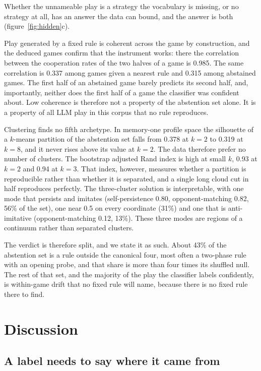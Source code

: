 \documentclass[11pt,a4paper]{article}
\begin{document}
Whether the unnameable play is a strategy the vocabulary is missing, or no
strategy at all, has an answer the data can bound, and the answer is both
(figure~\ref{fig:hidden}c).

Play generated by a fixed rule is coherent across the game by construction,
and the deduced games confirm that the instrument works: there the correlation
between the cooperation rates of the two halves of a game is 0.985. The same
correlation is 0.337 among games given a nearest rule and 0.315 among
abstained games. The first half of an abstained game barely predicts its
second half, and, importantly, neither does the first half of a game the
classifier was confident about. Low coherence is therefore not a property of
the abstention set alone. It is a property of all LLM play in this corpus that
no rule reproduces.

Clustering finds no fifth archetype. In memory-one profile space the
silhouette of a $k$-means partition of the abstention set falls from 0.378 at
$k = 2$ to 0.319 at $k = 8$, and it never rises above its value at $k = 2$.
The data therefore prefer no number of clusters. The bootstrap adjusted Rand
index is high at small $k$, 0.93 at $k=2$ and 0.94 at $k=3$. That index,
however, measures whether a partition is reproducible rather than whether it
is separated, and a single long cloud cut in half reproduces perfectly. The
three-cluster solution is interpretable, with one mode that persists and
imitates (self-persistence 0.80, opponent-matching 0.82, 56\% of the set), one
near 0.5 on every coordinate (31\%) and one that is anti-imitative
(opponent-matching 0.12, 13\%). These three modes are regions of a continuum
rather than separated clusters.

The verdict is therefore split, and we state it as such. About 43\% of the
abstention set is a rule outside the canonical four, most often a two-phase
rule with an opening probe, and that share is more than four times its
shuffled null. The rest of that set, and the majority of the play the
classifier labels confidently, is within-game drift that no fixed rule will
name, because there is no fixed rule there to find.

\section{Discussion}

\subsection{A label needs to say where it came from}
\end{document}
